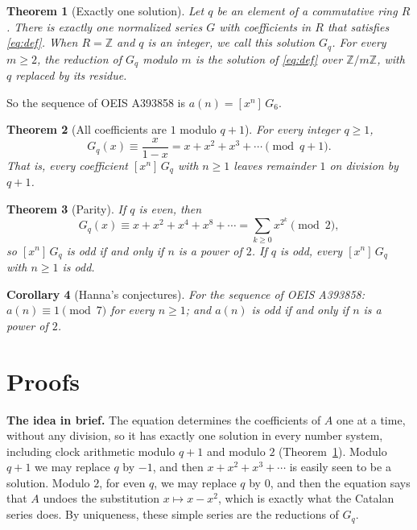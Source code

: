 \documentclass[11pt,a4paper]{article}
\newtheorem{theorem}{Theorem}[section]
\newtheorem{corollary}[theorem]{Corollary}
\theoremstyle{definition}
\theoremstyle{remark}
\newcommand{\Z}{\mathbb{Z}}
\newcommand{\coeff}[2]{[x^{#1}]\,#2}
\newcommand{\para}[1]{\par\medskip\noindent\textbf{#1}\enspace}
\begin{document}
\begin{theorem}[Exactly one solution]\label{thm:exist}
Let $q$ be an element of a commutative ring $R$. There is exactly one normalized series $G$ with coefficients in $R$
that satisfies \eqref{eq:def}. When $R=\Z$ and $q$ is an integer, we call this solution $G_q$. For every $m\ge2$, the
reduction of $G_q$ modulo $m$ is the solution of \eqref{eq:def} over $\Z/m\Z$, with $q$ replaced by its residue.
\end{theorem}

So the sequence of OEIS A393858 is $a(n)=\coeff{n}{G_{6}}$.

\begin{theorem}[All coefficients are $1$ modulo $q+1$]\label{thm:mod}
For every integer $q\ge1$,
\[
G_q(x)\equiv\frac{x}{1-x}=x+x^2+x^3+\cdots\pmod{q+1}.
\]
That is, every coefficient $\coeff{n}{G_q}$ with $n\ge1$ leaves remainder $1$ on division by $q+1$.
\end{theorem}

\begin{theorem}[Parity]\label{thm:parity}
If $q$ is even, then
\[
G_q(x)\equiv x+x^2+x^4+x^8+\cdots=\sum_{k\ge0}x^{2^k}\pmod 2,
\]
so $\coeff{n}{G_q}$ is odd if and only if $n$ is a power of $2$. If $q$ is odd, every $\coeff{n}{G_q}$ with $n\ge1$
is odd.
\end{theorem}

\begin{corollary}[Hanna's conjectures]\label{cor:oeis}
For the sequence of OEIS A393858: $a(n)\equiv1\pmod{7}$ for every $n\ge1$; and $a(n)$ is odd if and only if $n$ is a power of $2$.
\end{corollary}

\section{Proofs}\label{sec:proofs}

\para{The idea in brief.} The equation determines the coefficients of $A$ one at a time, without any division, so it
has exactly one solution in every number system, including clock arithmetic modulo $q+1$ and modulo $2$
(Theorem~\ref{thm:exist}). Modulo $q+1$ we may replace $q$ by $-1$, and then $x+x^2+x^3+\cdots$ is easily seen to be a
solution. Modulo $2$, for even $q$, we may replace $q$ by $0$, and then the equation says that $A$ undoes the
substitution $x\mapsto x-x^2$, which is exactly what the Catalan series does. By uniqueness, these simple series are
the reductions of $G_q$.
\end{document}
